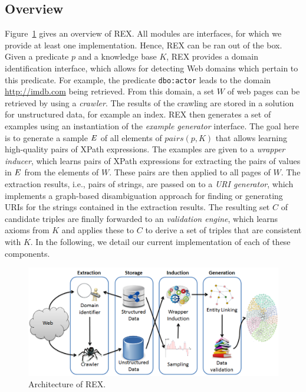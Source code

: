 \subsection{Overview}
Figure~\ref{charex:fig:architecture} gives an overview of REX. 
All modules are interfaces, for which we provide at least one implementation.
Hence, REX can be ran out of the box.
Given a predicate $p$ and a knowledge base $K$, REX provides a domain identification interface, which allows for detecting Web domains which pertain to this predicate.
For example, the predicate \texttt{dbo:actor} leads to the domain \url{http://imdb.com} being retrieved.
From this domain,  a set $W$ of web pages can be retrieved by using a \emph{crawler}.
The results of the crawling are stored in a solution for unstructured data, for example an index. 
REX then generates a set of examples using an instantiation of the \emph{example generator} interface. 
The goal here is to generate a sample $\mbox{\ensuremath{E}}$ of all elements of $pairs(p, K)$ that allows learning high-quality pairs of XPath expressions. 
The examples are given to a \emph{wrapper inducer}, which learns pairs of XPath expressions for extracting the pairs of values in $\mbox{\ensuremath{E}}$ from the elements of $W$. 
These pairs are then applied to all pages of $W$.
The extraction results, i.e., pairs of strings, are passed on to a \emph{URI generator}, which implements a graph-based disambiguation approach for finding or generating URIs for the strings contained in the extraction results.
The resulting set $C$ of candidate triples are finally forwarded to an \emph{validation engine}, which learns axioms from $K$ and applies these to $C$ to derive a set of triples that are consistent with $K$. 
In the following, we detail our current implementation of each of these components.  

\begin{figure}[htb]
\centering
\includegraphics[width = \textwidth]{chapter_three/semi_structured_annotation/ISWC_REX/rexArchitecture}
\caption{Architecture of REX.}
\label{charex:fig:architecture}
\end{figure}
